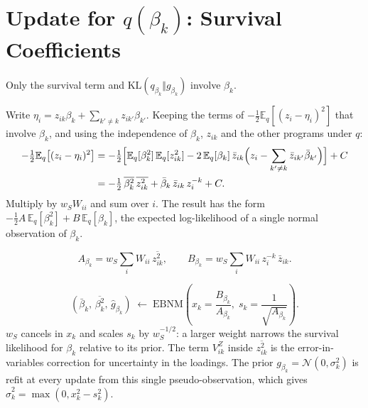 \documentclass[11pt]{article}
\newcommand{\zbar}[2]{\bar{z}_{#1#2}}
\newcommand{\betabar}[1]{\bar{\beta}_{#1}}
\newcommand{\zsec}[2]{\overline{z^2_{#1#2}}}
\newcommand{\betasec}[1]{\overline{\beta^2_{#1}}}
\newcommand{\E}{\mathbb{E}_q}
\newcommand{\KL}{\mathrm{KL}}
\newcommand{\ws}{w_S}
\begin{document}
\section{Update for $q(\beta_k)$: Survival Coefficients}\label{sec:beta}

Only the survival term and $\KL(q_{\beta_k}\Vert g_{\beta_k})$ involve $\beta_k$.

\begin{derivbox}
Write $\eta_i = z_{ik}\beta_k + \sum_{k'\ne k} z_{ik'}\beta_{k'}$. Keeping the
terms of $-\tfrac12\E[(z_i-\eta_i)^2]$ that involve $\beta_k$, and using the
independence of $\beta_k$, $z_{ik}$ and the other programs under $q$:
\begin{align*}
  -\tfrac12\E\bigl[(z_i - \eta_i)^2\bigr]
  &= -\tfrac12\Bigl[\E[\beta_k^2]\,\E[z_{ik}^2]
     - 2\,\E[\beta_k]\,\zbar{i}{k}\Bigl(z_i - \sum_{k'\ne k}\zbar{i}{k'}\betabar{k'}\Bigr)\Bigr] + C\\
  &= -\tfrac12\,\betasec{k}\,\zsec{i}{k} + \betabar{k}\,\zbar{i}{k}\,z^{-k}_i + C .
\end{align*}
Multiply by $\ws W_{ii}$ and sum over $i$. The result has the form
$-\tfrac12 A\,\E[\beta_k^2] + B\,\E[\beta_k]$, the expected log-likelihood of a
single normal observation of $\beta_k$.
\end{derivbox}

\begin{equation}\label{eq:AB-beta}
  A_{\beta_k} = \ws\sum_i W_{ii}\,\zsec{i}{k}, \qquad
  B_{\beta_k} = \ws\sum_i W_{ii}\,z^{-k}_i\,\zbar{i}{k}.
\end{equation}

\begin{ebnmbox}
\[
  (\betabar{k},\,\betasec{k},\,\hat g_{\beta_k})
  \;\leftarrow\; \mathrm{EBNM}\!\left(x_k = \frac{B_{\beta_k}}{A_{\beta_k}},\;
  s_k = \frac{1}{\sqrt{A_{\beta_k}}}\right).
\]
$\ws$ cancels in $x_k$ and scales $s_k$ by $\ws^{-1/2}$: a larger weight narrows
the survival likelihood for $\beta_k$ relative to its prior. The term $V^Z_{ik}$
inside $\zsec{i}{k}$ is the error-in-variables correction for uncertainty in the
loadings. The prior $g_{\beta_k} = \mathcal N(0,\sigma_k^2)$ is refit at every
update from this single pseudo-observation, which gives
$\hat\sigma_k^2 = \max(0, x_k^2 - s_k^2)$.
\end{ebnmbox}

\end{document}
